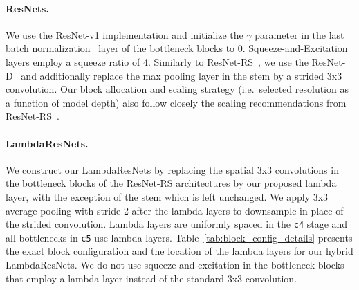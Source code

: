 \documentclass{article} \usepackage{iclr2021_conference,times}
\begin{document}
\vspace{-0.1cm}
\paragraph{ResNets.}
We use the ResNet-v1 implementation and initialize the $\gamma$ parameter in the last batch normalization~\citep{BatchNorm} layer of the bottleneck blocks to $0$.
Squeeze-and-Excitation layers employ a squeeze ratio of 4.
Similarly to ResNet-RS~\citep{bello2021revisiting}, we use the ResNet-D~\citep{he2018bag} and additionally replace the max pooling layer in the stem by a strided 3x3 convolution.
Our block allocation and scaling strategy (i.e.\ selected resolution as a function of model depth) also follow closely the scaling recommendations from ResNet-RS~\citep{bello2021revisiting}.

\vspace{-0.1cm}
\paragraph{LambdaResNets.}
We construct our LambdaResNets by replacing the spatial 3x3 convolutions in the bottleneck blocks of the ResNet-RS architectures by our proposed lambda layer, with the exception of the stem which is left unchanged.
We apply 3x3 average-pooling with stride 2 after the lambda layers to downsample in place of the strided convolution.
Lambda layers are uniformly spaced in the \texttt{c4} stage and all bottlenecks in \texttt{c5} use lambda layers.
Table~\ref{tab:block_config_details} presents the exact block configuration and the location of the lambda layers for our hybrid LambdaResNets.
We do not use squeeze-and-excitation in the bottleneck blocks that employ a lambda layer instead of the standard 3x3 convolution.
    
\end{document}
